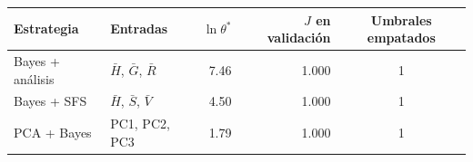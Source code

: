 \footnotesize
\begin{tabular}{llrrc}
\toprule
Estrategia & Entradas & $\ln\theta^*$ & $J$ en validación & Umbrales empatados \\
\midrule
Bayes + análisis & $\bar H$, $\bar G$, $\bar R$ & 7.46 & 1.000 & 1 \\
Bayes + SFS & $\bar H$, $\bar S$, $\bar V$ & 4.50 & 1.000 & 1 \\
PCA + Bayes & PC1, PC2, PC3 & 1.79 & 1.000 & 1 \\
\bottomrule
\end{tabular}
